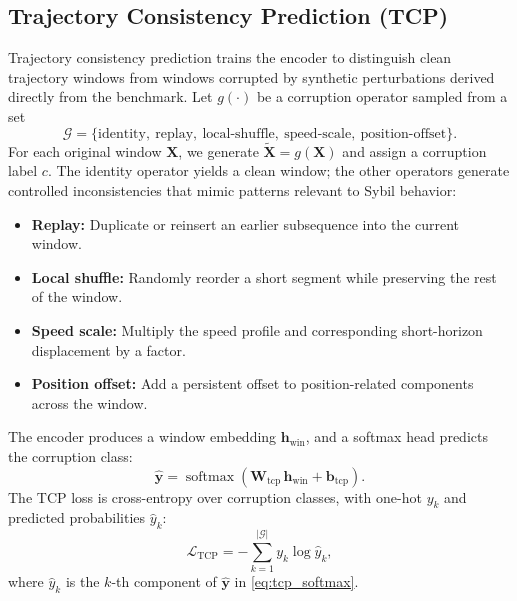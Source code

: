 \documentclass[12pt]{article}
\begin{document}
\subsection{Trajectory Consistency Prediction (TCP)}

Trajectory consistency prediction trains the encoder to distinguish clean trajectory windows from windows corrupted by synthetic perturbations derived directly from the benchmark. Let $g(\cdot)$ be a corruption operator sampled from a set
\begin{equation}
\mathcal{G} = \{\text{identity},\ \text{replay},\ \text{local-shuffle},\ \text{speed-scale},\ \text{position-offset}\}.
\end{equation}
For each original window $\mathbf{X}$, we generate $\tilde{\mathbf{X}} = g(\mathbf{X})$ and assign a corruption label $c$. The identity operator yields a clean window; the other operators generate controlled inconsistencies that mimic patterns relevant to Sybil behavior:

\begin{itemize}
    \item \textbf{Replay:} Duplicate or reinsert an earlier subsequence into the current window.
    \item \textbf{Local shuffle:} Randomly reorder a short segment while preserving the rest of the window.
    \item \textbf{Speed scale:} Multiply the speed profile and corresponding short-horizon displacement by a factor.
    \item \textbf{Position offset:} Add a persistent offset to position-related components across the window.
\end{itemize}

The encoder produces a window embedding $\mathbf{h}_{\text{win}}$, and a softmax head predicts the corruption class:
\begin{equation}
\hat{\mathbf{y}} = \operatorname{softmax}\!\left(\mathbf{W}_{\text{tcp}}\,\mathbf{h}_{\text{win}} + \mathbf{b}_{\text{tcp}}\right).
\label{eq:tcp_softmax}
\end{equation}
The TCP loss is cross-entropy over corruption classes, with one-hot $y_k$ and predicted probabilities $\hat{y}_k$:
\begin{equation}
\mathcal{L}_{\text{TCP}} = - \sum_{k=1}^{|\mathcal{G}|} y_k \log \hat{y}_k,
\end{equation}
where $\hat{y}_k$ is the $k$-th component of $\hat{\mathbf{y}}$ in \eqref{eq:tcp_softmax}.
\end{document}
